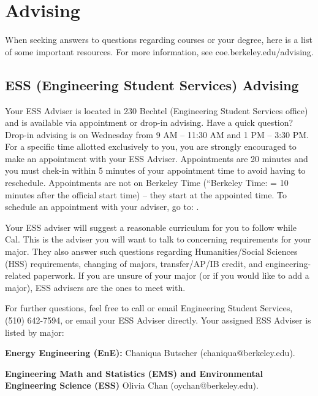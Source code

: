\chapter*{Advising}

When seeking answers to questions regarding courses or your degree, here is a list of some important resources. For more information, see {\selectfont coe.berkeley.edu/advising}.

\section*{ESS (Engineering Student Services) Advising}

Your ESS Adviser is located in 230 Bechtel (Engineering Student Services office) and is available via appointment or drop-in advising.
Have a quick question?
Drop-in advising  is on Wednesday from 9 AM – 11:30 AM and 1 PM – 3:30 PM. For a specific time allotted exclusively to you, you are strongly encouraged to make an appointment with your ESS Adviser. Appointments are 20 minutes and you must chek-in within 5 minutes of your appointment time to avoid having to reschedule. Appointments are not on Berkeley Time (``Berkeley Time: = 10 minutes after the official start time) -- they start at the appointed time. To schedule an appointment with your adviser, go to: .

Your ESS adviser will suggest a reasonable curriculum for you to follow while Cal. This is the adviser you will want to talk to concerning requirements for your major. They also answer such questions regarding Humanities/Social Sciences (HSS) requirements, changing of majors, transfer/AP/IB credit, and engineering-related paperwork. If you are unsure of your major (or if you would like to add a major), ESS advisers are the ones to meet with.

For further questions, feel free to call or email Engineering Student Services, (510) 642-7594, or email your ESS Adviser directly. Your assigned ESS Adviser is listed by major:

\textbf{Energy Engineering (EnE):} Chaniqua Butscher ({\selectfont chaniqua@berkeley.edu}).

\textbf{Engineering Math and Statistics (EMS) and Environmental Engineering Science (ESS)} Olivia Chan ({\selectfont oychan@berkeley.edu}).

